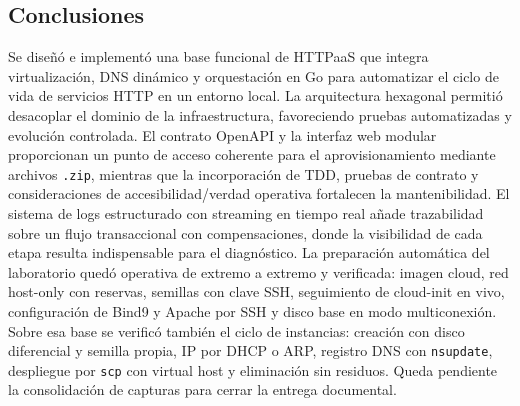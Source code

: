 \subsection{Conclusiones}
Se diseñó e implementó una base funcional de HTTPaaS que integra virtualización, DNS dinámico y orquestación en Go para automatizar el ciclo de vida de servicios HTTP en un entorno local. La arquitectura hexagonal permitió desacoplar el dominio de la infraestructura, favoreciendo pruebas automatizadas y evolución controlada. El contrato OpenAPI y la interfaz web modular proporcionan un punto de acceso coherente para el aprovisionamiento mediante archivos \texttt{.zip}, mientras que la incorporación de TDD, pruebas de contrato y consideraciones de accesibilidad/verdad operativa fortalecen la mantenibilidad. El sistema de logs estructurado con streaming en tiempo real añade trazabilidad sobre un flujo transaccional con compensaciones, donde la visibilidad de cada etapa resulta indispensable para el diagnóstico. La preparación automática del laboratorio quedó operativa de extremo a extremo y verificada: imagen cloud, red host-only con reservas, semillas con clave SSH, seguimiento de cloud-init en vivo, configuración de Bind9 y Apache por SSH y disco base en modo multiconexión. Sobre esa base se verificó también el ciclo de instancias: creación con disco diferencial y semilla propia, IP por DHCP o ARP, registro DNS con \texttt{nsupdate}, despliegue por \texttt{scp} con virtual host y eliminación sin residuos. Queda pendiente la consolidación de capturas para cerrar la entrega documental.

